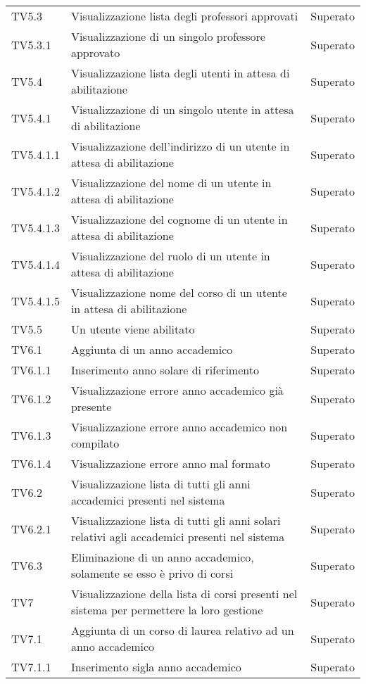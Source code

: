 \documentclass[PianoDiQualifica.tex]{subfiles}
\begin{document}
\begin{longtable}[H]{P{2cm}P{8.5cm}P{3cm}}
	TV5.3 & Visualizzazione lista degli professori approvati & Superato \\ 
	TV5.3.1 & Visualizzazione di un singolo professore approvato & Superato \\ 
	TV5.4 & Visualizzazione lista degli utenti in attesa di abilitazione & Superato \\ 
	TV5.4.1 & Visualizzazione di un singolo utente in attesa di abilitazione & Superato \\ 
	TV5.4.1.1 & Visualizzazione dell'indirizzo di un utente in attesa di abilitazione & Superato \\ 
	TV5.4.1.2 & Visualizzazione del nome di un utente in attesa di abilitazione & Superato \\ 
	TV5.4.1.3 & Visualizzazione del cognome di un utente in attesa di abilitazione & Superato \\ 
	TV5.4.1.4 & Visualizzazione del ruolo di un utente in attesa di abilitazione & Superato \\ 
	TV5.4.1.5 & Visualizzazione nome del corso di un utente in attesa di abilitazione & Superato \\ 
	TV5.5 & Un utente viene abilitato & Superato \\ 
	TV6.1 & Aggiunta di un anno accademico & Superato \\ 
	TV6.1.1 & Inserimento anno solare di riferimento & Superato \\ 
	TV6.1.2 & Visualizzazione errore anno accademico già presente & Superato \\ 
	TV6.1.3 & Visualizzazione errore anno accademico non compilato & Superato \\ 
	TV6.1.4 & Visualizzazione errore anno mal formato & Superato \\ 
	TV6.2 & Visualizzazione lista di tutti gli anni accademici presenti nel sistema & Superato \\ 
	TV6.2.1 & Visualizzazione lista di tutti gli anni solari relativi agli accademici presenti nel sistema & Superato \\ 
	TV6.3 & Eliminazione di un anno accademico, solamente se esso è privo di corsi & Superato \\ 
	TV7 & Visualizzazione della lista di corsi presenti nel sistema per permettere la loro gestione & Superato \\ 
	TV7.1 & Aggiunta di un corso di laurea relativo ad un anno accademico & Superato \\ 
	TV7.1.1 & Inserimento sigla anno accademico & Superato \\ 

\end{longtable}
\end{document}
